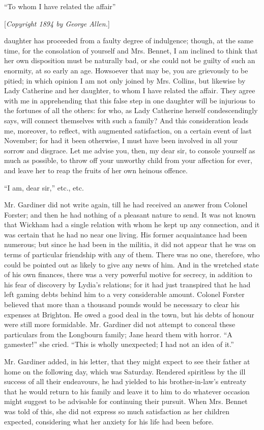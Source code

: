 \documentclass[12pt,openright]{book}
\begin{document}
“To whom I have related the affair”


[\textit{Copyright 1894 by George Allen.}]

daughter has proceeded from a faulty degree of indulgence; though, at the same time, for the consolation of yourself and Mrs. Bennet, I am inclined to think that her own disposition must be naturally bad, or she could not be guilty of such an enormity, at so early an age. Howsoever that may be, you are grievously to be pitied; in which opinion I am not only joined by Mrs. Collins, but likewise by Lady Catherine and her daughter, to whom I have related the affair. They agree with me in apprehending that this false step in one daughter will be injurious to the fortunes of all the others: for who, as Lady Catherine herself condescendingly says, will connect themselves with such a family? And this consideration leads me, moreover, to reflect, with augmented satisfaction, on a certain event of last November; for had it been otherwise, I must have been involved in all your sorrow and disgrace. Let me advise you, then, my dear sir, to console yourself as much as possible, to throw off your unworthy child from your affection for ever, and leave her to reap the fruits of her own heinous offence.

“I am, dear sir,” etc., etc.


Mr. Gardiner did not write again, till he had received an answer from Colonel Forster; and then he had nothing of a pleasant nature to send. It was not known that Wickham had a single relation with whom he kept up any connection, and it was certain that he had no near one living. His former acquaintance had been numerous; but since he had been in the militia, it did not appear that he was on terms of particular friendship with any of them. There was no one, therefore, who could be pointed out as likely to give any news of him. And in the wretched state of his own finances, there was a very powerful motive for secrecy, in addition to his fear of discovery by Lydia’s relations; for it had just transpired that he had left gaming debts behind him to a very considerable amount. Colonel Forster believed that more than a thousand pounds would be necessary to clear his expenses at Brighton. He owed a good deal in the town, but his debts of honour were still more formidable. Mr. Gardiner did not attempt to conceal these particulars from the Longbourn family; Jane heard them with horror. “A gamester!” she cried. “This is wholly unexpected; I had not an idea of it.”

Mr. Gardiner added, in his letter, that they might expect to see their father at home on the following day, which was Saturday. Rendered spiritless by the ill success of all their endeavours, he had yielded to his brother-in-law’s entreaty that he would return to his family and leave it to him to do whatever occasion might suggest to be advisable for continuing their pursuit. When Mrs. Bennet was told of this, she did not express so much satisfaction as her children expected, considering what her anxiety for his life had been before.
\end{document}
